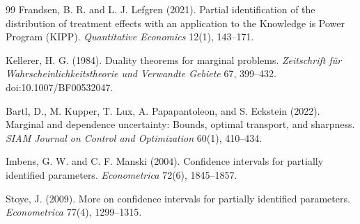 \documentclass[11pt]{article}
\theoremstyle{definition}
\theoremstyle{plain}
\theoremstyle{remark}
\begin{document}
\begin{thebibliography}{99}
Frandsen, B. R. and L. J. Lefgren (2021).
Partial identification of the distribution of treatment effects with an application to the Knowledge is Power Program (KIPP).
\textit{Quantitative Economics} 12(1), 143--171.

Kellerer, H. G. (1984).
Duality theorems for marginal problems.
\textit{Zeitschrift f{\"u}r Wahrscheinlichkeitstheorie und Verwandte Gebiete} 67, 399--432.
doi:10.1007/BF00532047.

Bartl, D., M. Kupper, T. Lux, A. Papapantoleon, and S. Eckstein (2022).
Marginal and dependence uncertainty: Bounds, optimal transport, and sharpness.
\textit{SIAM Journal on Control and Optimization} 60(1), 410--434.

Imbens, G. W. and C. F. Manski (2004).
Confidence intervals for partially identified parameters.
\textit{Econometrica} 72(6), 1845--1857.

Stoye, J. (2009).
More on confidence intervals for partially identified parameters.
\textit{Econometrica} 77(4), 1299--1315.
\end{thebibliography}
\end{document}
